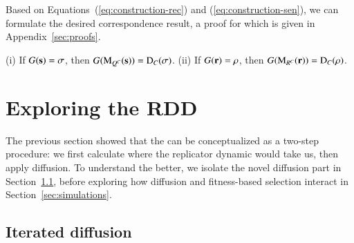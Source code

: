 \documentclass[fleqn,reqno,10pt]{article}
\renewcommand{\Smixed}{\ensuremath{\mathrm{\mathbf{s}}}}
\renewcommand{\Rmixed}{\ensuremath{\mathrm{\mathbf{r}}}}
\newcommand{\rdd}{\acro{rdd}} %
\newcommand{\Diff}{\ensuremath{\mathrm{D}}} %
\newcommand{\Mutate}{\ensuremath{\mathrm{M}}} %
\begin{document}
Based on Equations~(\ref{eq:construction-rec}) and
(\ref{eq:construction-sen}), we can formulate the desired
correspondence result, a proof for which is given in Appendix~\ref{sec:proofs}.

\begin{theorem}
  \label{thm:Correspondence}
  (i) If $G(\Smixed) = \Sstrat$, then $G(\Mutate_{Q^C}(\Smixed)) =
  \Diff_C(\Sstrat)$. (ii) If $G(\Rmixed) = \Rstrat$, then
  $G(\Mutate_{R^C}(\Rmixed)) = \Diff_C(\Rstrat)$.
\end{theorem}



\section{Exploring the RDD}
\label{sec:exploring-rdd}

The previous section showed that the \rdd can be conceptualized as a
two-step procedure: we first calculate where the replicator dynamic
would take us, then apply diffusion. To understand the \rdd better, we
isolate the novel diffusion part in
Section~\ref{sec:iterated-diffusion}, before exploring how diffusion
and fitness-based selection interact in Section~\ref{sec:simulations}.

\subsection{Iterated diffusion}
\label{sec:iterated-diffusion}
\end{document}
